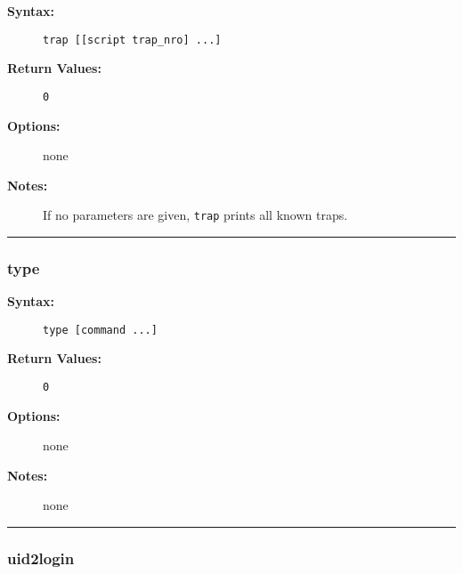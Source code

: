 \begin{description}
\item[{\bf Syntax:}] \mbox{}

{\tt trap [[script trap\_nro] ...]}

\item[{\bf Return Values:}] \mbox{}

\begin{description}
\item[{\tt 0}] \mbox{}



\end{description}


\item[{\bf Options:}] \mbox{}

none  

\item[{\bf Notes:}] \mbox{}

If no parameters are given, {\tt trap} prints all 
known traps.

\end{description}


\hrule
\subsubsection{type}

\begin{description}
\item[{\bf Syntax:}] \mbox{}

{\tt type [command ...]}

\item[{\bf Return Values:}] \mbox{}

\begin{description}
\item[{\tt 0}] \mbox{}



\end{description}


\item[{\bf Options:}] \mbox{}

none  

\item[{\bf Notes:}] \mbox{}

none

\end{description}


\hrule
\subsubsection{uid2login}

